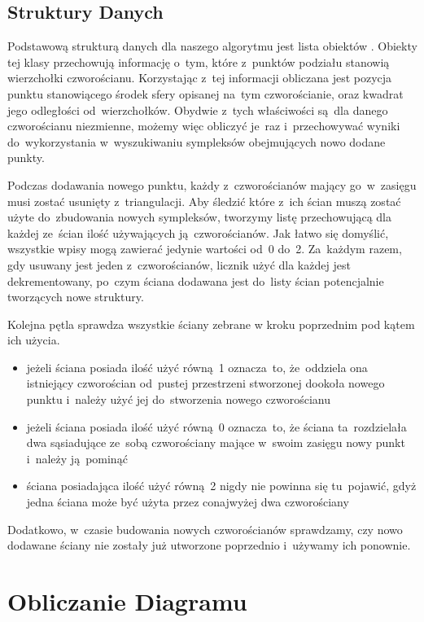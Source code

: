 \documentclass[skorowidz,autorrok,backref,xodstep,oswiadczenie]{wmimgr}
\begin{document}
\subsection{Struktury Danych}

Podstawową strukturą danych dla naszego algorytmu jest lista obiektów . Obiekty tej klasy przechowują informację o~tym, które z~punktów podziału stanowią wierzchołki czworościanu. Korzystając z~tej informacji obliczana jest pozycja punktu stanowiącego środek sfery opisanej na~tym czworościanie, oraz kwadrat jego odległości od~wierzchołków. Obydwie z~tych właściwości są~dla danego czworościanu niezmienne, możemy więc obliczyć je~raz i~przechowywać wyniki do~wykorzystania w~wyszukiwaniu sympleksów obejmujących nowo dodane punkty.

Podczas dodawania nowego punktu, każdy z~czworościanów mający go~w~zasięgu musi zostać usunięty z~triangulacji. Aby śledzić które z~ich ścian muszą zostać użyte do~zbudowania nowych sympleksów, tworzymy listę przechowującą dla każdej ze~ścian ilość używających ją~czworościanów. Jak łatwo się domyślić, wszystkie wpisy mogą zawierać jedynie wartości od~0 do~2. Za~każdym razem, gdy usuwany jest jeden z~czworościanów, licznik użyć dla każdej jest dekrementowany, po~czym ściana dodawana jest do~listy ścian potencjalnie tworzących nowe struktury.

Kolejna pętla sprawdza wszystkie ściany zebrane w kroku poprzednim pod kątem ich użycia.
\begin{itemize}
\item
jeżeli ściana posiada ilość użyć równą~1 oznacza~to, że~oddziela ona istniejący czworościan od~pustej przestrzeni stworzonej dookoła nowego punktu i~należy użyć jej do~stworzenia nowego czworościanu
\item
jeżeli ściana posiada ilość użyć równą~0 oznacza~to, że ściana ta~rozdzielała dwa sąsiadujące ze~sobą czworościany mające w~swoim zasięgu nowy punkt i~należy ją~pominąć
\item
ściana posiadająca ilość użyć równą~2 nigdy nie powinna się tu~pojawić, gdyż jedna ściana może być użyta przez conajwyżej dwa czworościany
\end{itemize}

Dodatkowo, w~czasie budowania nowych czworościanów sprawdzamy, czy nowo dodawane ściany nie zostały już utworzone poprzednio i~używamy ich ponownie.

\section{Obliczanie Diagramu}
\end{document}
